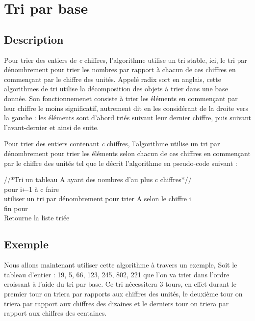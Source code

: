 \documentclass[12pt]{article}
\begin{document}
\newpage

\section{Tri par base}
\subsection{Description}

\hspace{1.0 cm}Pour trier des entiers de \textit{c }chiffres, l'algorithme utilise un tri stable, ici, le tri par dénombrement pour trier les nombres par rapport à chacun de ces chiffres en commençant par le chiffre des unités. 
Appelé radix sort en anglais, cette algorithmes de tri utilise la décomposition des objets à trier dans une base donnée.  Son fonctionnemenet consiste à trier les éléments en commençant par leur chiffre le moins significatif, autrement dit en les considérant de la droite vers la gauche : les éléments sont  d’abord triés suivant leur dernier chiffre, puis suivant l’avant-dernier et ainsi de suite. 

Pour trier des entiers contenant \textit{c} chiffres, l'algorithme utilise un tri par dénombrement pour trier les éléments selon chacun de ces chiffres en commençant par le chiffre des unités tel que le décrit l'algorithme en pseudo-code suivant : 


\begin{tcolorbox}

//*Tri un tableau A ayant des nombres d’au plus c chiffres*// \\
pour i←1 à c faire \\
\hspace*{1.0 cm} utiliser un tri par dénombrement pour trier A selon le chiffre i \\
fin pour \\
Retourne la liste triée\\
\end{tcolorbox}




\subsection{Exemple}
\hspace{1.0 cm} Nous allons maintenant utiliser cette algorithme à travers un exemple,  
Soit le tableau d’entier : 19, 5, 66, 123, 245, 802, 221 que l’on va trier dans l’ordre croissant à l'aide du tri par base. Ce tri nécessitera 3 tours, en effet durant le premier tour on triera par rapports aux chiffres des unités, le deuxième tour on triera par rapport aux chiffres des dizaines et le derniers tour on triera par rapport aux chiffres des centaines.
\end{document}
